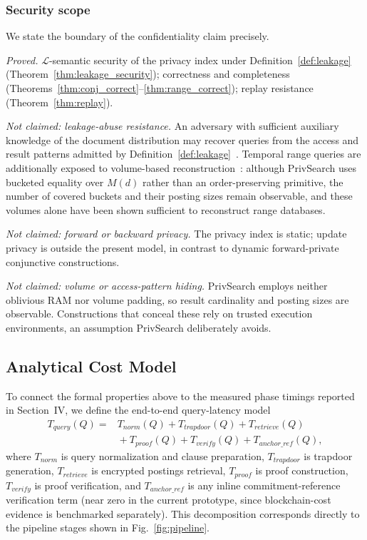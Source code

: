 \subsubsection{Security scope}
\label{subsubsec:security_scope}
We state the boundary of the confidentiality claim precisely.

\emph{Proved.} $\mathcal{L}$-semantic security of the privacy index under Definition~\ref{def:leakage} (Theorem~\ref{thm:leakage_security}); correctness and completeness (Theorems~\ref{thm:conj_correct}--\ref{thm:range_correct}); replay resistance (Theorem~\ref{thm:replay}).

\emph{Not claimed: leakage-abuse resistance.} An adversary with sufficient auxiliary knowledge of the document distribution may recover queries from the access and result patterns admitted by Definition~\ref{def:leakage}~\cite{Islam2012,CashLeakage2015,Zhang2016}.
Temporal range queries are additionally exposed to volume-based reconstruction~\cite{Grubbs2018}: although PrivSearch uses bucketed equality over $M(d)$ rather than an order-preserving primitive, the number of covered buckets and their posting sizes remain observable, and these volumes alone have been shown sufficient to reconstruct range databases.

\emph{Not claimed: forward or backward privacy.} The privacy index is static; update privacy is outside the present model, in contrast to dynamic forward-private conjunctive constructions.

\emph{Not claimed: volume or access-pattern hiding.} PrivSearch employs neither oblivious RAM nor volume padding, so result cardinality and posting sizes are observable. Constructions that conceal these rely on trusted execution environments, an assumption PrivSearch deliberately avoids.

\subsection{Analytical Cost Model}
\label{3F}
To connect the formal properties above to the measured phase timings reported in Section~IV, we define the end-to-end query-latency model
\begin{equation}
\begin{aligned}
T_{query}(Q) = {}& T_{norm}(Q)+T_{trapdoor}(Q)+T_{retrieve}(Q) \\
& {}+T_{proof}(Q)+T_{verify}(Q)+T_{anchor\_ref}(Q),
\end{aligned}
\label{eq:tquery}
\end{equation}
where $T_{norm}$ is query normalization and clause preparation, $T_{trapdoor}$ is trapdoor generation, $T_{retrieve}$ is encrypted postings retrieval, $T_{proof}$ is proof construction, $T_{verify}$ is proof verification, and $T_{anchor\_ref}$ is any inline commitment-reference verification term (near zero in the current prototype, since blockchain-cost evidence is benchmarked separately). This decomposition corresponds directly to the pipeline stages shown in Fig.~\ref{fig:pipeline}.

